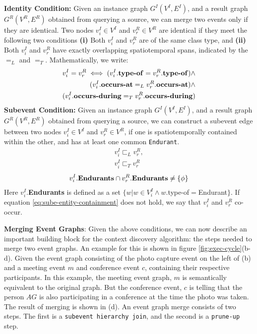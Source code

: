 \textbf{Identity Condition:} Given an instance graph $G^I(V^I, E^I)$, and a result graph $G^R(V^R, E^R)$ obtained from querying a source, we can merge two events only if they are identical. Two nodes $v^I_i \in V^I$ and $v^R_r \in V^R$ are identical if they meet the following two conditions \textbf{(i)} Both $v^I_i$ and $v^R_r$ are of the same class type, and \textbf{(ii)} Both $v^I_i$ and $v^R_r$ have exactly overlapping spatiotemporal spans, indicated by the $=_L$ and $=_T$. Mathematically, we write: 
\begin{equation}
\label{eq:identity}
\begin{aligned}
v^I_i = v^R_r \iff (v^I_i.\text{\textbf{type-of}} = v^R_r.\text{\textbf{type-of}}) \wedge \\ 
(v^I_i.\text{\textbf{occurs-at}} =_L v^R_r.\text{\textbf{occurs-at}}) \wedge \\
(v^I_i.\text{\textbf{occurs-during}} =_T v^R_r.\text{\textbf{occurs-during}})
\end{aligned}
\end{equation}
\textbf{Subevent Condition:} Given an instance graph $G^I(V^I, E^I)$, and a result graph $G^R(V^R, E^R)$ obtained from querying a source, we can construct a subevent edge between two nodes $v^I_i \in V^I$ and $v^R_r \in V^R$, if one is spatiotemporally contained within the other, and has at least one common \texttt{Endurant}.
\begin{equation}
\label{eq:sube-st-containment}
\begin{aligned}
   v^I_i \sqsubset_L v^R_r,\\
   v^I_i \sqsubset_T v^R_r
\end{aligned}
\end{equation}
\begin{equation}
\label{eq:sube-entity-containment}
\begin{aligned}
   v^I_i.\text{\textbf{Endurants}} \cap v^R_r.\text{\textbf{Endurants}} \neq \{\phi\}\\
\end{aligned}
\end{equation}
Here $v^I_i.$\textbf{Endurants} is defined as a set $\{w | w \in V^I_i \wedge w.$type-of$ = $Endurant$\}$. If equation \eqref{eq:sube-entity-containment} does not hold, we say that $v^I_i$ and $v^R_r$ co-occur.

\textbf{Merging Event Graphs}: Given the above conditions, we can now describe an important building block for the context discovery algorithm: the steps needed to merge two event graphs. An example for this is shown in figure \ref{fig:exec-cycle}(b-d). Given the event graph consisting of the photo capture event on the left of (b) and a meeting event $m$ and conference event $c$, containing their respective participants. In this example, the meeting event graph, $m$ is semantically equivalent to the original graph. But the conference event, $c$ is telling that the person $AG$ is also participating in a conference at the time the photo was taken. The result of merging is shown in (d). An event graph merge consists of two steps. The first is a \texttt{subevent hierarchy join}, and the second is a \texttt{prune-up} step. 

